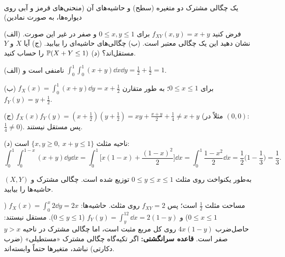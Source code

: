 \begin{center}
\\
{\small یک چگالی مشترک دو متغیره (سطح) و حاشیه‌های آن (منحنی‌های قرمز و آبی روی دیواره‌ها، به صورت نمادین)}
\end{center}

\begin{example}
فرض کنید $f_{XY}(x,y)=x+y$ برای $0\le x,y\le1$ و صفر در غیر این صورت.
(الف) نشان دهید این یک چگالی معتبر است. (ب) چگالی‌های حاشیه‌ای را بیابید. (ج) آیا $X$ و $Y$ مستقل‌اند؟ (د) $\mathbb{P}(X+Y\le1)$ را حساب کنید.
\begin{solution}
(الف) نامنفی است و $\int_0^1\!\int_0^1(x+y)\dd x\dd y=\frac12+\frac12=1$.

(ب) $f_X(x)=\int_0^1(x+y)\dd y=x+\frac12$ برای $0\le x\le1$؛ به طور متقارن $f_Y(y)=y+\frac12$.

(ج) $f_X(x)f_Y(y)=(x+\frac12)(y+\frac12)=xy+\frac{x+y}{2}+\frac14\neq x+y$ (مثلاً در $(0,0)$: $\frac14\neq0$). پس مستقل نیستند.

(د) ناحیه مثلث $\{x,y\ge0,\ x+y\le1\}$ است:
\[
\int_0^1\!\!\int_0^{1-x}(x+y)\dd y\dd x=\int_0^1\Big[x(1-x)+\frac{(1-x)^2}{2}\Big]\dd x=\int_0^1\frac{1-x^2}{2}\dd x=\frac12\Big(1-\frac13\Big)=\frac13 .
\]
\end{solution}
\end{example}

\begin{example}
$(X,Y)$ به‌طور یکنواخت روی مثلث $0\le y\le x\le1$ توزیع شده است. چگالی مشترک و حاشیه‌ها را بیابید.
\begin{solution}
مساحت مثلث $\frac12$ است؛ پس $f_{XY}=2$ روی مثلث. حاشیه‌ها:
$f_X(x)=\int_0^x2\dd y=2x$ ($0\le x\le1$) و $f_Y(y)=\int_y^12\dd x=2(1-y)$ ($0\le y\le1$).
مستقل نیستند: حاصل‌ضرب $4x(1-y)$ روی کل مربع مثبت است، اما چگالی مشترک در ناحیه $y>x$ صفر است. \textbf{قاعده سرانگشتی:} اگر تکیه‌گاه چگالی مشترک «مستطیلی» (ضرب دکارتی) نباشد، متغیرها حتماً وابسته‌اند.
\end{solution}
\end{example}

